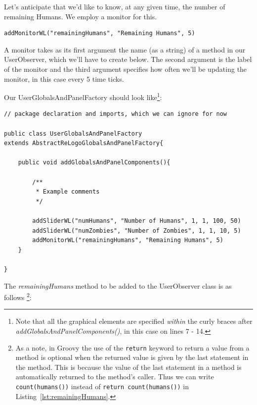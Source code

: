 \documentclass[11pt]{amsart}
\begin{document}
Let's anticipate that we'd like to know, at any given time, the number of remaining Humans. We employ a monitor for this.

\noindent\begin{minipage}[h]{\textwidth}
\vspace{.2in}
\lstset{language=java, numbers=none}
\begin{lstlisting}
addMonitorWL("remainingHumans", "Remaining Humans", 5)
\end{lstlisting}
\vspace{.2in}
\end{minipage}

A monitor takes as its first argument the name (as a string) of a method in our UserObserver, which we'll have to create below. The second argument is the label of the monitor and the third argument specifies how often we'll be updating the monitor, in this case every 5 time ticks.

Our UserGlobalsAndPanelFactory should look like\footnote{Note that all the graphical elements are specified \emph{within} the curly braces after \emph{addGlobalsAndPanelComponents()}, in this case on lines 7 - 14.}:

\noindent\begin{minipage}[h]{\textwidth}
\vspace{.2in}
\lstset{language=java,caption=The UserGlobalsAndPanelFactory class.,label=lst:ugpf}
\begin{lstlisting}
// package declaration and imports, which we can ignore for now

public class UserGlobalsAndPanelFactory
extends AbstractReLogoGlobalsAndPanelFactory{

	public void addGlobalsAndPanelComponents(){
		
		/**
		 * Example comments
		 */
		
		addSliderWL("numHumans", "Number of Humans", 1, 1, 100, 50)
		addSliderWL("numZombies", "Number of Zombies", 1, 1, 10, 5)
		addMonitorWL("remainingHumans", "Remaining Humans", 5)
	}
	
}
\end{lstlisting}
\vspace{.2in}
\end{minipage}



The \emph{remainingHumans} method to be added to the UserObserver class is as follows \footnote{As a note, in Groovy the use of the \texttt{return} keyword to return a value from a method is optional when the returned value is given by the last statement in the method. This is because the value of the last statement in a method is automatically returned to the method's caller. Thus we can write \texttt{count(humans())} instead of \texttt{return count(humans())} in Listing~\ref{lst:remainingHumans}.}:
\end{document}
